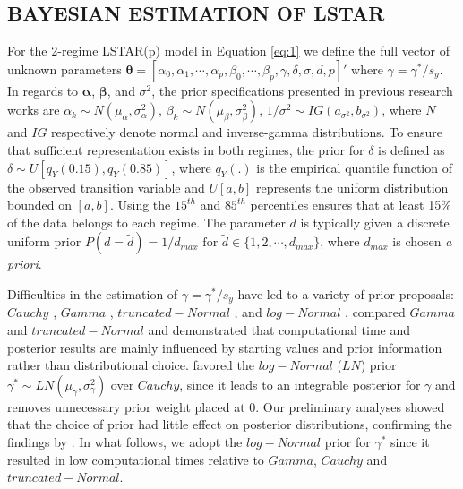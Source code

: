 \subsection{BAYESIAN ESTIMATION OF LSTAR}
 For the 2-regime LSTAR(p) model in Equation \ref{eq:1} we define the full vector of unknown parameters $\bm{\theta}=[\alpha_0, \alpha_1, \cdots, \alpha_p, \beta_0,\cdots,\beta_p, \gamma,\delta,\sigma,d,p]'$ where $\gamma=\gamma^*/s_y$. In regards to $\bm{\alpha}$, $\bm{\beta}$, and $\sigma^2$, the prior specifications presented in previous research works are  $\alpha_k \sim N(\mu_\alpha,\sigma^2_\alpha)$, $\beta_k \sim N(\mu_\beta,\sigma^2_\beta)$, $1/\sigma^2 \sim IG(a_{\sigma^2},b_{\sigma^2})$, where $N$ and $IG$ respectively denote normal and inverse-gamma distributions. To ensure that sufficient representation exists in both regimes, the prior for $\delta$ is defined as $\delta \sim U[q_Y(0.15),q_Y(0.85)]$, where $q_Y(.)$ is the empirical quantile function of the observed transition variable and $U[a,b]$ represents the uniform distribution bounded on  $[a,b]$. Using the $15^{th}$ and $85^{th}$ percentiles ensures that at least 15\% of the data belongs to each regime. The parameter $d$ is typically given a discrete uniform prior $P(d=\tilde{d})=1/d_{max} \textrm{ for } \tilde{d} \in \{1,2,\cdots,d_{max}\}$, where $d_{max}$ is chosen \textit{a priori}.
 
Difficulties in the estimation of $\gamma=\gamma^*/s_y$ have led to a variety of prior proposals: $Cauchy$ \citep{Lubrano2000},  $Gamma$ \citep{Lopes2006}, $truncated-Normal$ \citep{Livingston2017}, and $log-Normal$ \citep{Gerlach2008}.  \cite{Livingston2017} compared  $Gamma$ and $truncated-Normal$ and demonstrated that computational time and posterior results are mainly influenced by starting values and prior information rather than distributional choice. \cite{Gerlach2008} favored the $log-Normal$ ($LN$) prior $\gamma^* \sim LN(\mu_\gamma,\sigma^2_\gamma)$ over $Cauchy$, since it leads to an integrable posterior for $\gamma$ and removes unnecessary prior weight placed at 0. Our preliminary analyses showed that the choice of prior had little effect on posterior distributions, confirming the findings by \cite{Livingston2017}. In what follows, we adopt the $log-Normal$ prior for $\gamma^*$ since it resulted in low computational times relative to $Gamma$, $Cauchy$ and $truncated-Normal$.
 
